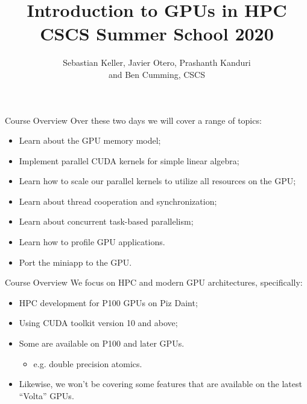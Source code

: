 \documentclass[aspectratio=43]{beamer}
\author{Sebastian Keller, Javier Otero, Prashanth Kanduri\\ and Ben Cumming, CSCS}
\title{Introduction to GPUs in HPC\\CSCS Summer School 2020}
\subtitle{}
\begin{document}
\cscstitle


\begin{frame}[fragile]{Course Overview}
    Over these two days we will cover a range of topics:
    \begin{itemize}
        \item Learn about the GPU memory model;
        \item Implement parallel CUDA kernels for simple linear algebra;
        \item Learn how to scale our parallel kernels to utilize all resources on the GPU;
        \item Learn about thread cooperation and synchronization;
        \item Learn about concurrent task-based parallelism;
        \item Learn how to profile GPU applications.
        \item Port the miniapp to the GPU.
    \end{itemize}
\end{frame}

\begin{frame}[fragile]{Course Overview}
    We focus on HPC and modern GPU architectures, specifically:
    \begin{itemize}
        \item HPC development for P100 GPUs on Piz Daint;
        \item Using CUDA toolkit version 10 and above;
        \item Some are available on P100 and later GPUs.
        \begin{itemize}
            \item  e.g. double precision atomics.
        \end{itemize}
        \item Likewise, we won't be covering some features that are available on the latest ``Volta'' GPUs.
    \end{itemize}
\end{frame}
\end{document}
